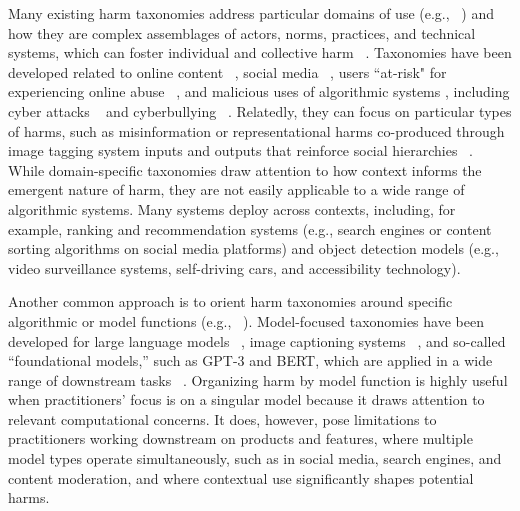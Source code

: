 Many existing harm taxonomies address particular domains of use (e.g., ~\cite{Scheuerman_Jiang_Fiesler_Brubaker_2021, Tran_Valecha2019}) and how they are complex assemblages of actors, norms, practices, and technical systems, which can foster individual and collective harm ~\cite{Puar_2020}. Taxonomies have been developed related to online content ~\cite{Banko_Mackeen_Ray, Scheuerman_Jiang_Fiesler_Brubaker_2021, Walker_DeVito_2020}, social media ~\cite{Nova_DeVito_Saha_Rashid_Roy_Turzo_Afrin_Guha, Tran_Valecha2019, Tran_Valecha_Rad_Rao_2020}, users ``at-risk" for experiencing online abuse ~\cite{ThomasSOK, WarfordSOK}, and malicious uses of algorithmic systems \cite{brundage2018malicious}, including cyber attacks ~\cite{Agrafiotis_Nurse_Goldsmith_Creese_Upton_2018} and cyberbullying ~\cite{Ashktorab2018}. Relatedly, they can focus on particular types of harms, such as misinformation \cite{Tran_Valecha_Rad_Rao_2020} or representational harms co-produced through image tagging system inputs and outputs that reinforce social hierarchies ~\cite{Katzman_Barocas_Blodgett_Laird_Scheuerman_Wallach_2021, Wang_Barocas_Laird_Wallach_2022}. While domain-specific taxonomies draw attention to how context informs the emergent nature of harm, they are not easily applicable to a wide range of algorithmic systems. Many systems deploy across contexts, including, for example, ranking and recommendation systems (e.g., search engines or content sorting algorithms on social media platforms) and object detection models (e.g., video surveillance systems, self-driving cars, and accessibility technology).

Another common approach is to orient harm taxonomies around specific algorithmic or model functions (e.g., ~\cite{Ekstrand_Das_Burke_Diaz_2022, Weidinger2022}). Model-focused taxonomies have been developed for large language models ~\cite{Weidinger2022}, image captioning systems ~\cite{Katzman_Barocas_Blodgett_Laird_Scheuerman_Wallach_2021, Wang_Barocas_Laird_Wallach_2022}, and so-called “foundational models,” such as GPT-3 and BERT, which are applied in a wide range of downstream tasks ~\cite{Bommasani_2021}. Organizing harm by model function is highly useful when practitioners’ focus is on a singular model because it draws attention to relevant computational concerns. It does, however, pose limitations to practitioners working downstream on products and features, where multiple model types operate simultaneously, such as in social media, search engines, and content moderation, and where contextual use significantly shapes potential harms. 

